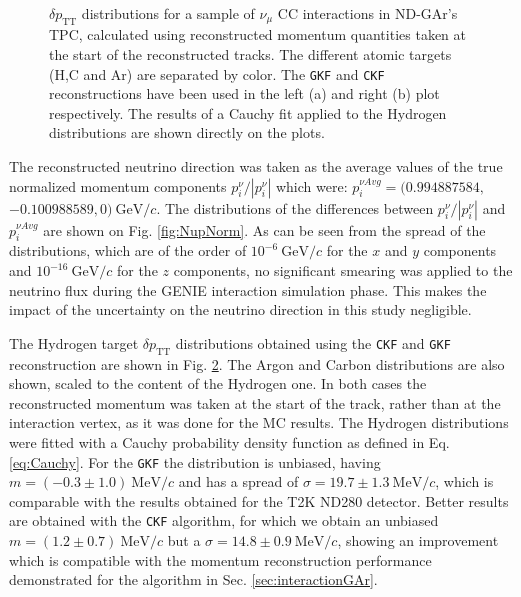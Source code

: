 \begin{figure}[t]
\begin{subfigure}[b]{0.48\textwidth}
         \caption{}
         \label{fig:dpTT_ALICEReco}
     \end{subfigure}
        \caption{$\delta p_\text{TT}$ distributions for a sample of $\nu_\mu$ CC interactions in ND-GAr's TPC, calculated using reconstructed momentum quantities taken at the start of the reconstructed tracks. The different atomic targets (H,C and Ar) are separated by color. The \texttt{GKF} and \texttt{CKF} reconstructions have been used in the left (a) and right (b) plot respectively. The results of a Cauchy fit applied to the Hydrogen distributions are shown directly on the plots.} \label{fig:dpTT}
\end{figure}

The reconstructed neutrino direction was taken as the average values of the true normalized momentum components $p^\nu_i/|p^\nu_i|$ which were: $p^{\nu Avg}_i = (0.994887584,$ $ -0.100988589 , 0) \ \text{GeV}/c$. The distributions of the differences between $p^\nu_i/|p^\nu_i|$ and $p^{\nu Avg}_i$ are shown on Fig. \ref{fig:NupNorm}. As can be seen from the spread of the distributions, which are of the order of $10^{-6} \ \text{GeV}/c$ for the $x$ and $y$ components and $10^{-16} \ \text{GeV}/c$ for the $z$ components, no significant smearing was applied to the neutrino flux during the GENIE interaction simulation phase. This makes the impact of the uncertainty on the neutrino direction in this study negligible. 

The Hydrogen target $\delta p_\text{TT}$ distributions obtained using the \texttt{CKF} and \texttt{GKF} reconstruction are shown in Fig. \ref{fig:dpTT}. The Argon and Carbon distributions are also shown, scaled to the content of the Hydrogen one. In both cases the reconstructed momentum was taken at the start of the track, rather than at the interaction vertex, as it was done for the MC results. The Hydrogen distributions were fitted with a Cauchy probability density function as defined in Eq. \ref{eq:Cauchy}. For the \texttt{GKF} the distribution is unbiased, having $m=(-0.3\pm1.0) \ \text{MeV}/c$ and has a spread of $\sigma = 19.7\pm1.3 \ \text{MeV}/c$, which is comparable with the results obtained for the T2K ND280 detector. Better results are obtained with the \texttt{CKF} algorithm, for which we obtain an unbiased $m=(1.2\pm0.7) \ \text{MeV}/c$ but a $\sigma = 14.8\pm0.9 \ \text{MeV}/c$, showing an improvement which is compatible with the momentum reconstruction performance demonstrated for the algorithm in Sec. \ref{sec:interactionGAr}.


